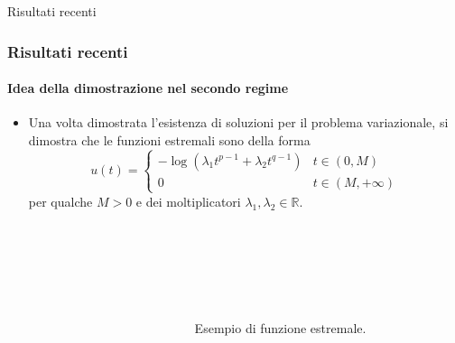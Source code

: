\documentclass[aspectratio=141]{beamer}
\newcommand{\R}{\mathbb{R}} %
\newcommand{\emptyline}{\phantom{ }\\}
\begin{document}
\begin{section}{Risultati recenti}
	\begin{frame}
		\frametitle{Risultati recenti}
		\framesubtitle{Idea della dimostrazione nel secondo regime}
		\begin{itemize}
			\item Una volta dimostrata l'esistenza di soluzioni per il problema variazionale, si dimostra che le funzioni estremali sono della forma
			\begin{equation*}\label{expression u}
				u(t) = \begin{cases}
					-\log\left(\lambda_1 t^{p-1} + \lambda_2 t^{q-1}\right) & t \in (0,M)\\
					0 & t \in (M,+\infty)
				\end{cases}
			\end{equation*}
			per qualche $M>0$ e dei moltiplicatori $\lambda_1, \lambda_2 \in \R$.
		\end{itemize}
		\begin{columns}[onlytextwidth,T]
			\begin{column}{.45\linewidth}
				\begin{figure}
				\end{figure}
			\end{column}
			\begin{column}{.45\linewidth}
				\emptyline
				\emptyline
				\emptyline
				\emptyline
				\begin{flushleft}
					\hspace{-1cm}Esempio di funzione estremale.
				\end{flushleft}				
			\end{column}
		\end{columns}
		\begin{center}
			
		\end{center}
	\end{frame}


\end{section}
\end{document}
